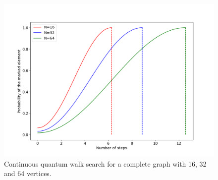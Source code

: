             	\begin{figure}[!t]
                    \centering \includegraphics[scale=0.40]{img/ContQuantumWalk/Search/163264.png}
                     \caption{Continuous quantum walk search for a complete graph with 16, 32 and 64 vertices.}\label{fig:ContSearch}
                \end{figure}
                
